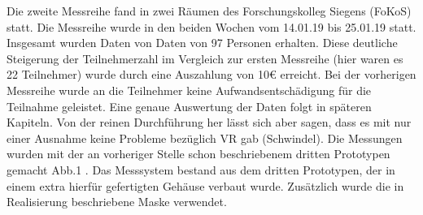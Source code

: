 
Die zweite Messreihe fand in zwei Räumen des Forschungskolleg Siegens (FoKoS) statt. Die Messreihe wurde in den beiden Wochen vom  14.01.19 bis 25.01.19 statt. Insgesamt wurden Daten von Daten von 97 Personen erhalten. Diese deutliche Steigerung der Teilnehmerzahl im Vergleich zur ersten Messreihe (hier waren es 22 Teilnehmer) wurde durch eine Auszahlung von 10€ erreicht. Bei der vorherigen Messreihe wurde an die Teilnehmer keine Aufwandsentschädigung für die Teilnahme geleistet. Eine genaue Auswertung der Daten folgt in späteren Kapiteln. Von der reinen Durchführung her lässt sich aber sagen, dass es mit nur einer Ausnahme keine Probleme bezüglich VR gab (Schwindel). Die Messungen wurden mit der an vorheriger Stelle schon beschriebenem dritten Prototypen gemacht Abb.1 . Das Messsystem bestand aus dem dritten Prototypen, der in einem extra hierfür gefertigten Gehäuse verbaut wurde. Zusätzlich wurde die in Realisierung beschriebene Maske verwendet. 